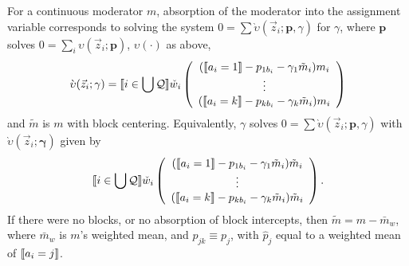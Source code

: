 \documentclass{article}
\DeclarePairedDelimiter{\indicator}{\llbracket}{\rrbracket}
\newcommand{\owt}[1][{[a_i]}]{\ensuremath{\check{w}_{i#1}}}
\newcommand{\absorbInterceptsEF}{\upsilon}
\newcommand{\absorbModeratorEF}{\grave{\upsilon}}
\begin{document}
For a continuous moderator $m$, absorption of the moderator into the assignment variable
corresponds to solving the system $0 = \sum
\absorbModeratorEF(\vec{z}_{i}; \mathbf{p},{\gamma})$ for
$\gamma$, where $\mathbf{p}$ solves $0 =
\sum_{i}\absorbInterceptsEF(\vec{z}_{i}; \mathbf{p})$,
$\absorbInterceptsEF(\cdot)$ as above, 
\begin{equation}
  \label{eq:18}
    \absorbModeratorEF(\vec{z}_{i}; \mathbf{\gamma})=
    \indicator{i \in \bigcup \mathcal{Q}} \owt[]
     \left(
       \begin{array}{c}
         (
         \indicator{a_{i}=1}-p_{1b_{i}}-\gamma_{1}
         \tilde{m}_{i}
         )m_{i} \\
         \vdots\\
         (\indicator{a_{i}=k}-p_{kb_{i}}
         - \gamma_{k} \tilde{m}_{i})m_{i}\\
       \end{array}
  \right)%
\end{equation}
and $\tilde{m}$ is $m$ with block centering. Equivalently, $\gamma$
solves $0 = \sum
\absorbModeratorEF(\vec{z}_{i}; \mathbf{p},{\gamma})$ with 
$\absorbModeratorEF(\vec{z}_{i}; \mathbf{\gamma})$ given by 
\begin{equation*}
    \indicator{i \in \bigcup \mathcal{Q}} \owt[]
     \left(
       \begin{array}{c}
         (\indicator{a_{i}=1}-p_{1b_{i}}-\gamma_{1}
         \tilde{m}_{i})\tilde{m}_{i} \\
         \vdots\\
         (\indicator{a_{i}=k}-p_{kb_{i}}
         - \gamma_{k} \tilde{m}_{i})\tilde{m}_{i}\\
       \end{array}
     \right).
\end{equation*}
If there were no blocks,
or no absorption of block intercepts, then $\tilde{m} = m -
\bar{m}_{w}$,  where $\bar{m}_{w}$ is $m$'s weighted mean, and $p_{jk}
\equiv p_{j}$, with $\hat{p}_{j}$ equal to a weighted mean of
$\indicator{a_{i}=j}$. 
\end{document}
